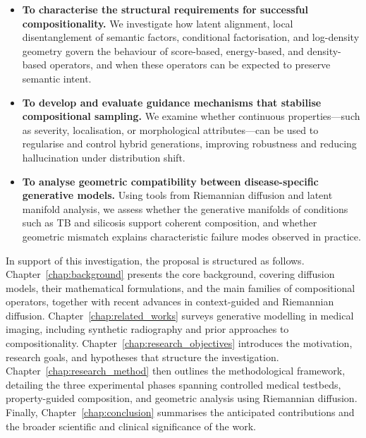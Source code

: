 \begin{itemize}
    \item \textbf{To characterise the structural requirements for successful
    compositionality.}  
    We investigate how latent alignment, local disentanglement of semantic
    factors, conditional factorisation, and log-density geometry govern the
    behaviour of score-based, energy-based, and density-based operators, and
    when these operators can be expected to preserve semantic intent.

    \item \textbf{To develop and evaluate guidance mechanisms that stabilise
    compositional sampling.}  
    We examine whether continuous properties—such as severity, localisation,
    or morphological attributes—can be used to regularise and control hybrid
    generations, improving robustness and reducing hallucination under
    distribution shift.

    \item \textbf{To analyse geometric compatibility between disease-specific
    generative models.}  
    Using tools from Riemannian diffusion and latent manifold analysis, we
    assess whether the generative manifolds of conditions such as TB and
    silicosis support coherent composition, and whether geometric mismatch
    explains characteristic failure modes observed in practice.
\end{itemize}


In support of this investigation, the proposal is structured as follows.  
Chapter~\ref{chap:background} presents the core background, covering diffusion
models, their mathematical formulations, and the main families of compositional
operators, together with recent advances in context-guided and Riemannian
diffusion.  
Chapter~\ref{chap:related_works} surveys generative modelling in medical
imaging, including synthetic radiography and prior approaches to
compositionality.  
Chapter~\ref{chap:research_objectives} introduces the motivation, research
goals, and hypotheses that structure the investigation.  
Chapter~\ref{chap:research_method} then outlines the methodological
framework, detailing the three experimental phases spanning controlled medical
testbeds, property-guided composition, and geometric analysis using Riemannian
diffusion.  
Finally, Chapter~\ref{chap:conclusion} summarises the anticipated contributions
and the broader scientific and clinical significance of the work.


